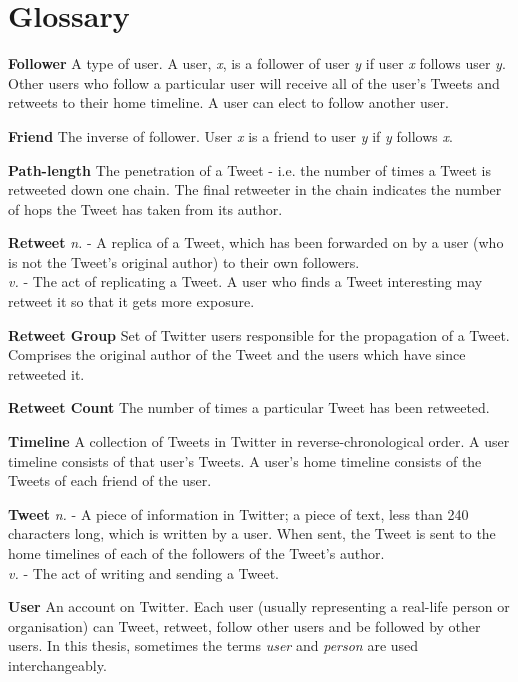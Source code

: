 \chapter*{Glossary} 

{\bf Follower}
A type of user. A user, \textit{x}, is a follower of user \textit{y} if user \textit{x} follows user \textit{y}. Other users who follow a particular user will receive all of the user's Tweets and retweets to their home timeline. A user can elect to follow another user.

{\bf Friend}
The inverse of follower. User \textit{x} is a friend to user \textit{y} if \textit{y} follows \textit{x}.

{\bf Path-length}
The penetration of a Tweet - i.e. the number of times a Tweet is retweeted down one chain. The final retweeter in the chain indicates the number of hops the Tweet has taken from its author.
			
{\bf Retweet}
\textit{n.} - A replica of a Tweet, which has been forwarded on by a user (who is not the Tweet's original author) to their own followers. \\
\textit{v.} - The act of replicating a Tweet. A user who finds a Tweet interesting may retweet it so that it gets more exposure.
									
{\bf Retweet Group}
Set of Twitter users responsible for the propagation of a Tweet. Comprises the original author of the Tweet and the users which have since retweeted it.

{\bf Retweet Count}
The number of times a particular Tweet has been retweeted.

{\bf Timeline}
A collection of Tweets in Twitter in reverse-chronological order. A user timeline consists of that user's Tweets. A user's home timeline consists of the Tweets of each friend of the user.

{\bf Tweet}
\textit{n.} - A piece of information in Twitter; a piece of text, less than 240 characters long, which is written by a user. When sent, the Tweet is sent to the home timelines of each of the followers of the Tweet's author.\\
\textit{v.} - The act of writing and sending a Tweet.

{\bf User}
An account on Twitter. Each user (usually representing a real-life person or organisation) can Tweet, retweet, follow other users and be followed by other users. In this thesis, sometimes the terms \textit{user} and \textit{person} are used interchangeably.